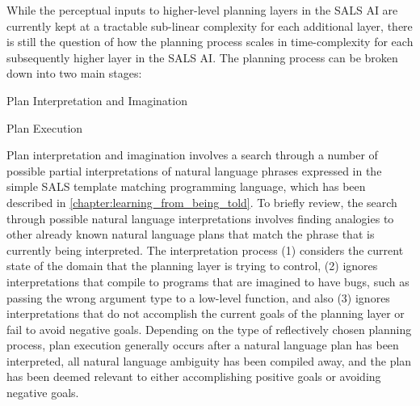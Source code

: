 While the perceptual inputs to higher-level planning layers in the
SALS AI are currently kept at a tractable sub-linear complexity for
each additional layer, there is still the question of how the planning
process scales in time-complexity for each subsequently higher layer
in the SALS AI.  The planning process can be broken down into two main
stages:
\begin{packed_enumerate}
\item{Plan Interpretation and Imagination}
\item{Plan Execution}
\end{packed_enumerate}
Plan interpretation and imagination involves a search through a number
of possible partial interpretations of natural language phrases
expressed in the simple SALS template matching programming language,
which has been described in
{\mbox{\autoref{chapter:learning_from_being_told}}}.
To briefly review, the search through possible natural language
interpretations involves finding analogies to other already known
natural language plans that match the phrase that is currently being
interpreted.  The interpretation process (1) considers the current
state of the domain that the planning layer is trying to control, (2)
ignores interpretations that compile to programs that are imagined to
have bugs, such as passing the wrong argument type to a low-level
function, and also (3) ignores interpretations that do not accomplish
the current goals of the planning layer or fail to avoid negative
goals.  Depending on the type of reflectively chosen planning process,
plan execution generally occurs after a natural language plan has been
interpreted, all natural language ambiguity has been compiled away,
and the plan has been deemed relevant to either accomplishing positive
goals or avoiding negative goals.

